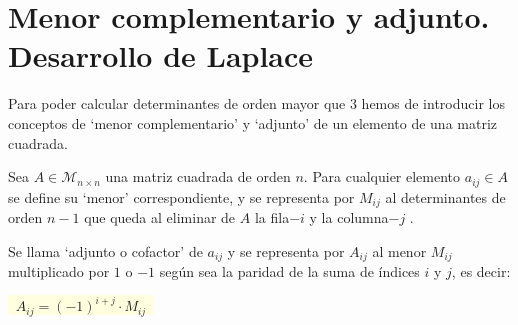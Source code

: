 \justify


\section[Menor complementario y adjunto. Desarrollo de Laplace]{Menor complementario y adjunto. Desarrollo de Laplace}


Para poder calcular determinantes de orden mayor que $3$ hemos de introducir los conceptos de `menor  complementario' y `adjunto' de un elemento de una matriz cuadrada.

\begin{defi}
Sea $A\in \mathcal M_{n\times n}$ una matriz cuadrada de orden $n$. Para cualquier elemento $a_{ij} \in A$ se define su `menor' correspondiente, y se representa por $M_{ij}$ al determinantes de orden $n-1$ que queda al eliminar de $A$ la fila$-i$ y la columna$-j$	.

Se llama `adjunto o cofactor' de $a_{ij}$ y se representa por $A_{ij}$ al menor $M_{ij}$ multiplicado por $1$ o $-1$ según sea la paridad de la suma de índices $i$ y $j$, es decir:

\centerline{\colorbox{LightYellow}{$\; \boxed{\; A_{ij}= (-1)^{i+j} \cdot M_{ij} \;}\;$}}

\end{defi}

